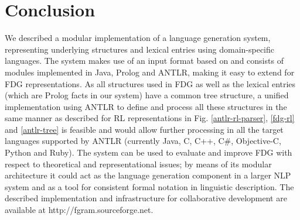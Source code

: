 \documentclass[a4paper, halfparskip, onecolumn, abstractoff, final]{scrartcl}
\newcommand{\noun}[1]{\textsc{#1}}
\begin{document}

\section{Conclusion}
\normalsize
We described a modular implementation of a language generation system, representing underlying structures and lexical entries using domain-specific languages. The system makes use of an input format based on \cite{Dik1997a} and consists of modules implemented in Java, Prolog and ANTLR, making it easy to extend for FDG representations. As all structures used in FDG as well as the lexical entries (which are Prolog facts in our system) have a common tree structure, a unified implementation using ANTLR to define and process all these structures in the same manner as described for RL representations in  Fig.  \ref{antlr-rl-parser}, \ref{fdg-rl} and \ref{antlr-tree} is feasible and would allow further processing in all the target languages supported by ANTLR (currently Java, C, C++, C\#, Objective-C, Python and Ruby). The system can be used to evaluate and improve FDG with respect to theoretical and representational issues; by means of its modular architecture it could act as the language generation component in a larger NLP system and as a tool for consistent formal notation in linguistic description. The described implementation and infrastructure for collaborative development are available at http://fgram.sourceforge.net.

\newpage




\end{document}
